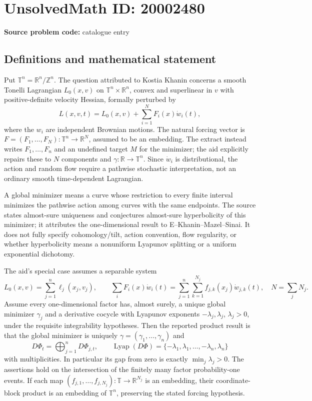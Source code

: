 \documentclass[11pt]{article}
\newcommand{\Z}{\mathbb{Z}}
\newcommand{\R}{\mathbb{R}}
\begin{document}
\section*{UnsolvedMath ID: 20002480}
\textbf{Source problem code:} catalogue entry
\subsection{Definitions and mathematical statement}
Put $\mathbb T^n=\R^n/\Z^n$. The question attributed to Kostia Khanin concerns a smooth Tonelli Lagrangian $L_0(x,v)$ on $\mathbb T^n\times\R^n$, convex and superlinear in $v$ with positive-definite velocity Hessian, formally perturbed by
\[
 L(x,v,t)=L_0(x,v)+\sum_{i=1}^{N}F_i(x)\dot w_i(t),
\]
where the $w_i$ are independent Brownian motions. The natural forcing vector is $F=(F_1,\ldots,F_N):\mathbb T^n\to\R^N$, assumed to be an embedding. The extract instead writes $F_1,\ldots,F_n$ and an undefined target $M$ for the minimizer; the aid explicitly repairs these to $N$ components and $\gamma:\R\to\mathbb T^n$. Since $\dot w_i$ is distributional, the action and random flow require a pathwise stochastic interpretation, not an ordinary smooth time-dependent Lagrangian.

A global minimizer means a curve whose restriction to every finite interval minimizes the pathwise action among curves with the same endpoints. The source states almost-sure uniqueness and conjectures almost-sure hyperbolicity of this minimizer; it attributes the one-dimensional result to E--Khanin--Mazel--Sinai. It does not fully specify cohomology/tilt, action convention, flow regularity, or whether hyperbolicity means a nonuniform Lyapunov splitting or a uniform exponential dichotomy.

The aid's special case assumes a separable system
\[
 L_0(x,v)=\sum_{j=1}^n\ell_j(x_j,v_j),\qquad
 \sum_iF_i(x)\dot w_i(t)=
 \sum_{j=1}^n\sum_{k=1}^{N_j}f_{j,k}(x_j)\dot w_{j,k}(t),
 \quad N=\sum_jN_j.
\]
Assume every one-dimensional factor has, almost surely, a unique global minimizer $\gamma_j$ and a derivative cocycle with Lyapunov exponents $-\lambda_j,\lambda_j$, $\lambda_j>0$, under the requisite integrability hypotheses. Then the reported product result is that the global minimizer is uniquely $\gamma=(\gamma_1,\ldots,\gamma_n)$ and
\[
 D\Phi_t=\bigoplus_{j=1}^nD\Phi_{j,t},\qquad
 \operatorname{Lyap}(D\Phi)=\{-\lambda_1,\lambda_1,\ldots,-\lambda_n,\lambda_n\}
\]
with multiplicities. In particular its gap from zero is exactly $\min_j\lambda_j>0$. The assertions hold on the intersection of the finitely many factor probability-one events. If each map $(f_{j,1},\ldots,f_{j,N_j}):\mathbb T\to\R^{N_j}$ is an embedding, their coordinate-block product is an embedding of $\mathbb T^n$, preserving the stated forcing hypothesis.
\end{document}

